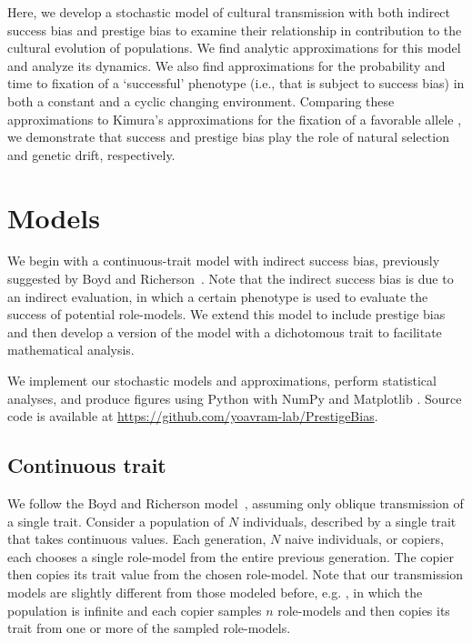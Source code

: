 \documentclass[12pt]{extarticle}
\begin{document}
Here, we develop a stochastic model of cultural transmission with both indirect success bias and prestige bias to examine their relationship in contribution to the cultural evolution of populations.
We find analytic approximations for this model and analyze its dynamics. We also find approximations for the probability and time to fixation of a `successful' phenotype (i.e., that is subject to success bias) in both a constant and a cyclic changing environment.
Comparing these approximations to Kimura's approximations for the fixation of a favorable allele \citep{kimura,kimura_average}, we demonstrate that success and prestige bias play the role of natural selection and genetic drift, respectively. 

\section*{Models}
We begin with a continuous-trait model with indirect success bias, previously suggested by Boyd and Richerson~\citep{evolutionBook}. Note that the indirect success bias is due to an indirect evaluation, in which a certain phenotype is used to evaluate the success of potential role-models.
We extend this model to include prestige bias and then develop a version of the model with a dichotomous trait to facilitate mathematical analysis.

We implement our stochastic models and approximations, perform statistical analyses, and produce figures using Python \citep{python} with NumPy \citep{numpy} and Matplotlib \citep{mathplotlib}. 
Source code is available at \href{https://github.com/yoavram-lab/PrestigeBias}{https://github.com/yoavram-lab/PrestigeBias}.

\subsection*{Continuous trait}
We follow the Boyd and Richerson model~\citep{evolutionBook}, assuming only oblique transmission of a single trait. 
Consider a population of $N$ individuals, described by a single trait that takes continuous values.
Each generation, $N$ naive individuals, or copiers, each chooses a single role-model from the entire previous generation. The copier then copies its trait value from the chosen role-model.
Note that our transmission models are slightly different from those modeled before, e.g. \citep{cumul_culture,Denton2021,evolutionBook}, in which the population is infinite and each copier samples $n$ role-models and then copies its trait from one or more of the sampled role-models.
\end{document}
